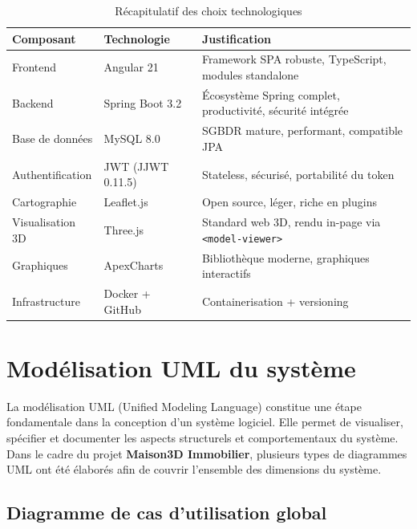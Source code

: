 \documentclass[a4paper,12pt]{report}
\begin{document}
\begin{table}[H]
\centering
\begin{tabular}{|p{3.5cm}|p{3.5cm}|p{7cm}|}
\hline
\textbf{Composant} & \textbf{Technologie} & \textbf{Justification} \\
\hline
Frontend & Angular 21 & Framework SPA robuste, TypeScript, modules standalone \\
\hline
Backend & Spring Boot 3.2 & Écosystème Spring complet, productivité, sécurité intégrée \\
\hline
Base de données & MySQL 8.0 & SGBDR mature, performant, compatible JPA \\
\hline
Authentification & JWT (JJWT 0.11.5) & Stateless, sécurisé, portabilité du token \\
\hline
Cartographie & Leaflet.js & Open source, léger, riche en plugins \\
\hline
Visualisation 3D & Three.js & Standard web 3D, rendu in-page via \texttt{<model-viewer>} \\
\hline
Graphiques & ApexCharts & Bibliothèque moderne, graphiques interactifs \\
\hline
Infrastructure & Docker + GitHub & Containerisation + versioning \\
\hline
\end{tabular}
\caption{Récapitulatif des choix technologiques}
\end{table}


\section{Modélisation UML du système}

La modélisation UML (Unified Modeling Language) constitue une étape fondamentale dans la conception d'un système logiciel. Elle permet de visualiser, spécifier et documenter les aspects structurels et comportementaux du système. Dans le cadre du projet \textbf{Maison3D Immobilier}, plusieurs types de diagrammes UML ont été élaborés afin de couvrir l'ensemble des dimensions du système.


\subsection{Diagramme de cas d'utilisation global}
\end{document}
